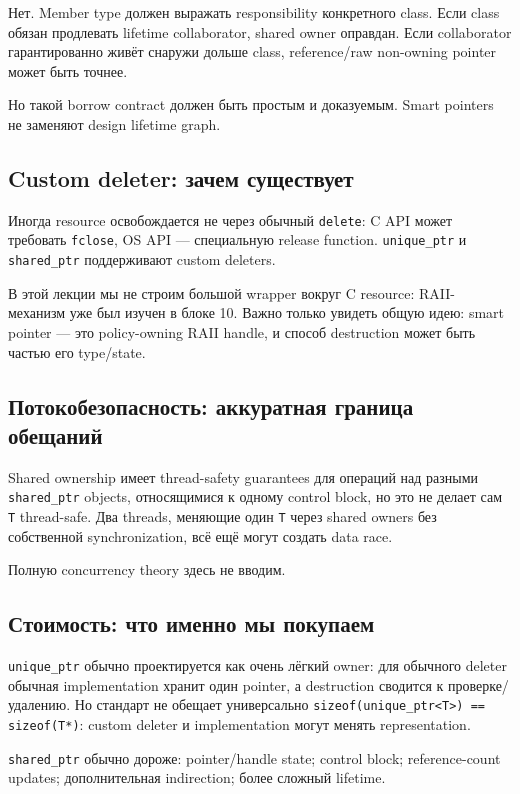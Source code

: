 Нет. Member type должен выражать responsibility конкретного class.
Если class обязан продлевать lifetime collaborator, shared owner оправдан.
Если collaborator гарантированно живёт снаружи дольше class, reference/raw
non-owning pointer может быть точнее.

Но такой borrow contract должен быть простым и доказуемым. Smart pointers не
заменяют design lifetime graph.

\subsection{Custom deleter: зачем существует}

Иногда resource освобождается не через обычный \texttt{delete}: C API может
требовать \texttt{fclose}, OS API --- специальную release function.
\texttt{unique\_ptr} и \texttt{shared\_ptr} поддерживают custom deleters.

В этой лекции мы не строим большой wrapper вокруг C resource: RAII-механизм уже
был изучен в блоке 10. Важно только увидеть общую идею: smart pointer --- это
policy-owning RAII handle, и способ destruction может быть частью его type/state.

\subsection{Потокобезопасность: аккуратная граница обещаний}

Shared ownership имеет thread-safety guarantees для операций над разными
\texttt{shared\_ptr} objects, относящимися к одному control block, но это не
делает сам \texttt{T} thread-safe. Два threads, меняющие один \texttt{T} через
shared owners без собственной synchronization, всё ещё могут создать data race.

Полную concurrency theory здесь не вводим.

\subsection{Стоимость: что именно мы покупаем}

\texttt{unique\_ptr} обычно проектируется как очень лёгкий owner: для обычного
deleter обычная implementation хранит один pointer, а destruction сводится к
проверке/удалению. Но стандарт не обещает универсально
\texttt{sizeof(unique\_ptr<T>) == sizeof(T*)}: custom deleter и implementation
могут менять representation.

\texttt{shared\_ptr} обычно дороже:
pointer/handle state; control block; reference-count updates; дополнительная indirection; более сложный lifetime.

